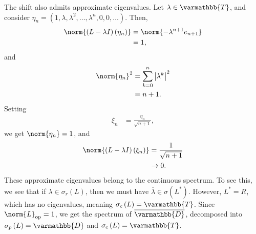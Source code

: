 \documentclass[10pt]{mypackage}
\renewcommand*{\mathbb}[1]{\varmathbb{#1}}
\begin{document}
\begin{example}
  The shift also admits approximate eigenvalues. Let $\lambda \in \mathbb{T}$, and consider $\eta_n = \left(1,\lambda,\lambda^2,\dots,\lambda^n,0,0,\dots\right)$. Then,
  \begin{align*}
    \norm{\left(L - \lambda I\right)\left(\eta_n\right)} &= \norm{-\lambda^{n+1}e_{n+1}}\\
                                            &= 1,
  \end{align*}
  and
  \begin{align*}
    \norm{\eta_n}^2 &= \sum_{k=0}^{n}\left\vert \lambda^k \right\vert^2\\
                    &= n+1.
  \end{align*}
  Setting
  \begin{align*}
    \xi_n &= \frac{\eta_n}{\sqrt{n+1}},
  \end{align*}
  we get $\norm{\eta_n} = 1$, and
  \begin{align*}
    \norm{\left(L - \lambda I\right)\left(\xi_n\right)} &= \frac{1}{\sqrt{n+1}}\\
                                                        &\rightarrow 0.
  \end{align*}
  These approximate eigenvalues belong to the continuous spectrum. To see this, we see that if $\lambda \in \sigma_r\left(L\right)$, then we must have $\overline{\lambda}\in \sigma\left(L^{\ast}\right)$. However, $L^{\ast} = R$, which has no eigenvalues, meaning $\sigma_c\left(L\right) = \mathbb{T}$. Since $\norm{L}_{\text{op}} = 1$, we get the spectrum of $\overline{\mathbb{D}}$, decomposed into $\sigma_p\left(L\right) = \mathbb{D}$ and $\sigma_c\left(L\right) = \mathbb{T}$.
\end{example}
\end{document}

